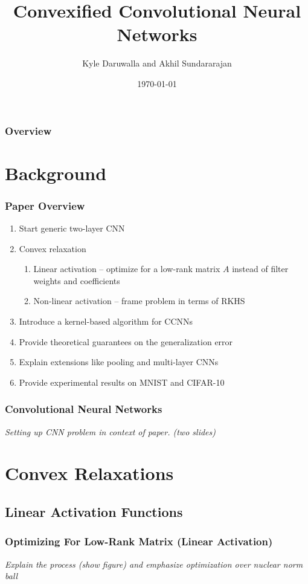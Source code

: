 \documentclass{beamer}
\title[ECE 901 Paper Presentation]{Convexified Convolutional Neural Networks} %
\author{Kyle Daruwalla and Akhil Sundararajan}
\institute[UW-Madison]{ECE 901 Fall 2016}
\date{\today}
\begin{document}
\begin{frame}
	\titlepage
\end{frame}

\begin{frame}
	\frametitle{Overview}
	\tableofcontents
\end{frame}


\section{Background}
\begin{frame}
	\frametitle{Paper Overview}
	\begin{enumerate}
		\item Start generic two-layer CNN
		\item Convex relaxation
		\begin{enumerate}
			\item Linear activation -- optimize for a low-rank matrix $A$ instead of filter weights and coefficients
			\item Non-linear activation -- frame problem in terms of RKHS
		\end{enumerate}
		\item Introduce a kernel-based algorithm for CCNNs
		\item Provide theoretical guarantees on the generalization error
		\item Explain extensions like pooling and multi-layer CNNs
		\item Provide experimental results on MNIST and CIFAR-10
	\end{enumerate}
\end{frame}

\begin{frame}
	\frametitle{Convolutional Neural Networks}
	\textit{Setting up CNN problem in context of paper. (two slides)}
\end{frame}

\section{Convex Relaxations}
\subsection{Linear Activation Functions}
\begin{frame}
	\frametitle{Optimizing For Low-Rank Matrix (Linear Activation)}
	\textit{Explain the process (show figure) and emphasize optimization over nuclear norm ball}
\end{frame}
\end{document}
